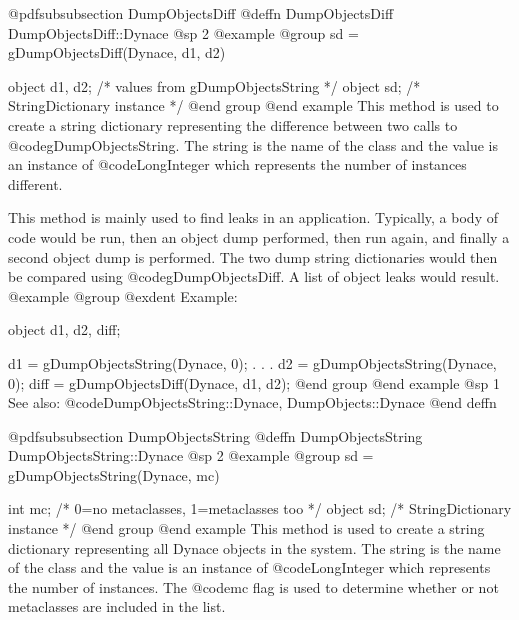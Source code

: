@pdfsubsubsection {DumpObjectsDiff}
@deffn {DumpObjectsDiff} DumpObjectsDiff::Dynace
@sp 2
@example
@group
sd = gDumpObjectsDiff(Dynace, d1, d2)

object  d1, d2; /*  values from gDumpObjectsString  */
object  sd;     /*  StringDictionary instance  */
@end group
@end example
This method is used to create a string dictionary representing
the difference between two calls to @code{gDumpObjectsString}.
The string is the name of the class and
the value is an instance of @code{LongInteger} which represents the
number of instances different.

This method is mainly used to find leaks in an application.  Typically,
a body of code would be run, then an object dump performed, then run
again, and finally a second object dump is performed.  The two dump
string dictionaries would then be compared using
@code{gDumpObjectsDiff}.  A list of object leaks would result.
@example
@group
@exdent Example:

object   d1, d2, diff;

d1 = gDumpObjectsString(Dynace, 0);
       .
       .
       .
d2 = gDumpObjectsString(Dynace, 0);
diff = gDumpObjectsDiff(Dynace, d1, d2);
@end group
@end example
@sp 1
See also:  @code{DumpObjectsString::Dynace, DumpObjects::Dynace}
@end deffn




























@pdfsubsubsection {DumpObjectsString}
@deffn {DumpObjectsString} DumpObjectsString::Dynace
@sp 2
@example
@group
sd = gDumpObjectsString(Dynace, mc)

int     mc;     /*  0=no metaclasses, 1=metaclasses too  */
object  sd;     /*  StringDictionary instance  */
@end group
@end example
This method is used to create a string dictionary representing all
Dynace objects in the system.  The string is the name of the class and
the value is an instance of @code{LongInteger} which represents the
number of instances.  The @code{mc} flag is used to determine whether or
not metaclasses are included in the list.

